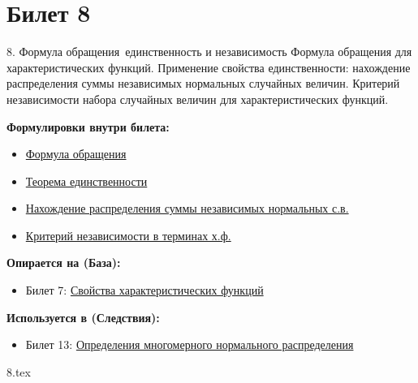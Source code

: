 \documentclass[a4paper, 12pt]{article}
\newcommand{\ticketsection}[1]{\vspace{0.5em}\noindent\textbf{\textcolor{ticketdark}{\sffamily #1}}\par}
\begin{document}
\section{Билет 8}
\begin{ticketskeleton}{8. Формула обращения\, единственность и независимость}
     Формула обращения для характеристических функций. Применение свойства единственности: нахождение распределения суммы независимых нормальных случайных величин. Критерий независимости набора случайных величин для характеристических функций.

    \ticketsection{Формулировки внутри билета:}
    \begin{itemize}
        \item \hyperref[thm:inversion]{ Формула обращения}
        \item \hyperref[thm:uniqueness]{ Теорема единственности}
        \item \hyperref[ex:sum_normal]{ Нахождение распределения суммы независимых нормальных с.в.}
        \item \hyperref[thm:indep_crit]{ Критерий независимости в терминах х.ф.}
    \end{itemize}

    \ticketsection{Опирается на (База):}
    \begin{itemize}
        \item Билет 7: \hyperref[lem:char_props]{Свойства характеристических функций}
    \end{itemize}

    \ticketsection{Используется в (Следствия):}
    \begin{itemize}
        \item Билет 13: \hyperref[thm:three_def]{Определения многомерного нормального распределения}
    \end{itemize}
\end{ticketskeleton}
{8.tex}
\end{document}
